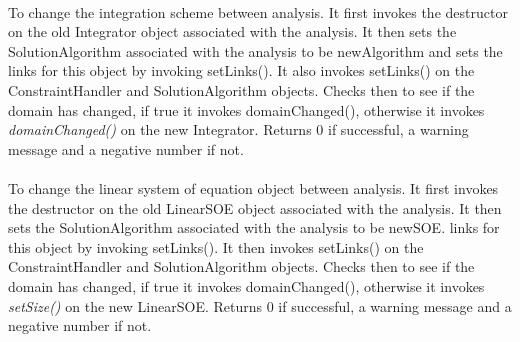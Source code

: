 \\
To change the integration scheme between analysis. It first invokes the
destructor on the old Integrator object associated with the
analysis. It then sets the SolutionAlgorithm 
associated with the analysis to be \p newAlgorithm and sets the
links for this object by invoking setLinks(). It also invokes
setLinks() on the ConstraintHandler and SolutionAlgorithm
objects. Checks then to see if the domain has changed, if true it
invokes domainChanged(), otherwise it invokes {\em
domainChanged()} on the new Integrator. Returns $0$ if
successful, a warning message and a negative number if not.\\

\\
To change the linear system of equation object between analysis. It
first invokes the destructor on the old LinearSOE object associated
with the analysis. It then sets the SolutionAlgorithm 
associated with the analysis to be \p newSOE.
links for this object by invoking setLinks(). It then invokes
setLinks() on the ConstraintHandler and SolutionAlgorithm
objects. Checks then to see if the domain has changed, if true it
invokes domainChanged(), otherwise it invokes {\em
setSize()} on the new LinearSOE. Returns $0$ if successful, a warning
message and a negative number if not.\\ 


